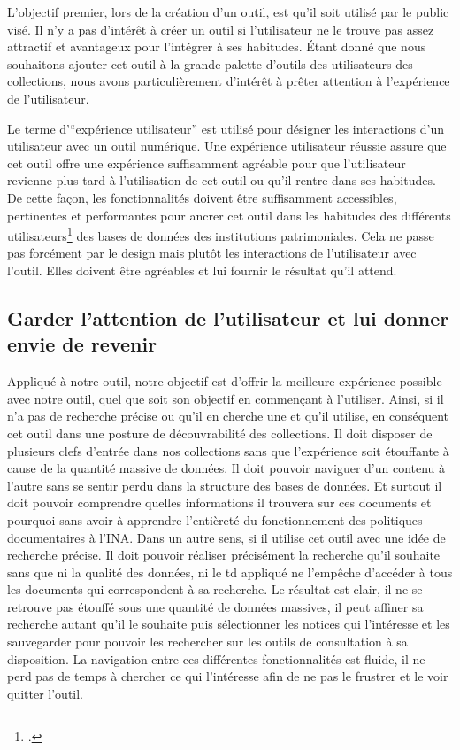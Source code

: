 
L'objectif premier, lors de la création d'un outil, est qu'il soit utilisé par le public visé. Il n'y a pas d'intérêt à créer un outil si l'utilisateur ne le trouve pas assez attractif et avantageux pour l'intégrer à ses habitudes. Étant donné que nous souhaitons ajouter cet outil à la grande palette d'outils des utilisateurs des collections, nous avons particulièrement d'intérêt à prêter attention à l'expérience de l'utilisateur. 


Le terme d'\enquote{expérience utilisateur} est utilisé pour désigner les interactions d'un utilisateur avec un outil numérique. Une expérience utilisateur réussie assure que cet outil offre une expérience suffisamment agréable pour que l'utilisateur revienne plus tard à l'utilisation de cet outil ou qu'il rentre dans ses habitudes. De cette façon, les fonctionnalités doivent être suffisamment accessibles, pertinentes et performantes pour ancrer cet outil dans les habitudes des différents utilisateurs\footcite{silberstein2024} des bases de données des institutions patrimoniales. Cela ne passe pas forcément par le design mais plutôt les interactions de l'utilisateur avec l'outil. Elles doivent être agréables et lui fournir le résultat qu'il attend. 

\subsection{Garder l'attention de l'utilisateur et lui donner envie de revenir}


Appliqué à notre outil, notre objectif est d'offrir la meilleure expérience possible avec notre outil, quel que soit son objectif en commençant à l'utiliser. Ainsi, si il n'a pas de recherche précise ou qu'il en cherche une et qu'il utilise, en conséquent cet outil dans une posture de découvrabilité des collections. Il doit disposer de plusieurs clefs d'entrée dans nos collections sans que l'expérience soit étouffante à cause de la quantité massive de données. Il doit pouvoir naviguer d'un contenu à l'autre sans se sentir perdu dans la structure des bases de données. Et surtout il doit pouvoir comprendre quelles informations il trouvera sur ces documents et pourquoi sans avoir à apprendre l'entièreté du fonctionnement des politiques documentaires à l'INA. Dans un autre sens, si il utilise cet outil avec une idée de recherche précise. Il doit pouvoir réaliser précisément la recherche qu'il souhaite sans que ni la qualité des données, ni le \gls{td} appliqué ne l'empêche d'accéder à tous les documents qui correspondent à sa recherche. Le résultat est clair, il ne se retrouve pas étouffé sous une quantité de données massives, il peut affiner sa recherche autant qu'il le souhaite puis sélectionner les notices qui l'intéresse et les sauvegarder pour pouvoir les rechercher sur les outils de consultation à sa disposition. La navigation entre ces différentes fonctionnalités est fluide, il ne perd pas de temps à chercher ce qui l'intéresse afin de ne pas le frustrer et le voir quitter l'outil. 

